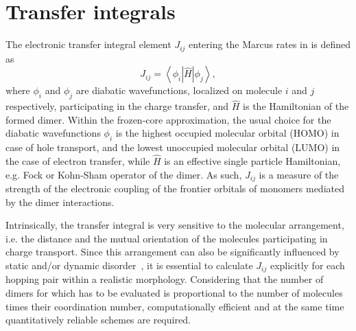 \section{Transfer integrals }
\label{sec:transfer_integrals}

The electronic transfer integral element $J_{ij}$ entering the Marcus rates in  is defined as
\begin{equation}
   J_{ij} = \left\langle \phi_i \left\vert \hat{H} \right\vert \phi_j \right\rangle ,
\label{equ:TI}
\end{equation}
where $\phi_i$ and $\phi_j$ are diabatic wavefunctions, localized on molecule $i$ and $j$ respectively, participating in the charge transfer, and $\hat{H}$ is the Hamiltonian of the formed dimer. Within the frozen-core approximation, the usual choice for the diabatic wavefunctions $\phi_i$ is the highest occupied molecular orbital (HOMO) in case of hole transport, and the lowest unoccupied molecular orbital (LUMO) in the case of electron transfer, while $\hat{H}$ is an effective single particle Hamiltonian, e.g. Fock or Kohn-Sham operator of the dimer. As such, $J_{ij}$ is a measure of the strength of the electronic coupling of the frontier orbitals of monomers mediated by the dimer interactions. 

Intrinsically, the transfer integral is very sensitive to the molecular arrangement, i.e. the distance and the mutual orientation of the molecules participating in charge transport. Since this arrangement can also be significantly influenced by static and/or dynamic disorder~\cite{baessler_charge_1993,troisi_charge-transport_2006,troisi_charge_2009,mcmahon_organic_2010,vehoff_charge_2010},
it is essential to calculate $J_{ij}$ explicitly for each hopping pair within a realistic morphology. Considering that the number of dimers for which  has to be evaluated is proportional to the number of molecules times their coordination number, computationally efficient and at the same time quantitatively reliable schemes are required.






